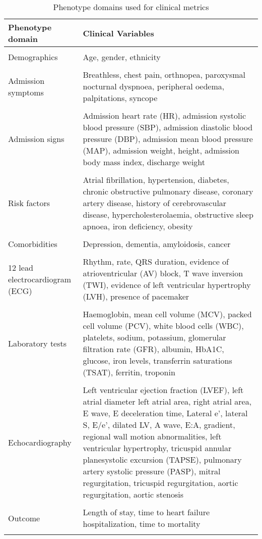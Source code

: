 \documentclass{article}
\begin{document}
\begin{longtable}{p{}  p{}}
    \caption{Phenotype domains used for clinical metrics}\\
    \toprule
    \textbf{Phenotype domain} & \textbf{Clinical Variables}\\
    \midrule
\endhead
&\\
Demographics & Age, gender, ethnicity\\
&\\
Admission symptoms & Breathless, chest pain, orthnopea, paroxysmal nocturnal dyspnoea, peripheral oedema, palpitations, syncope\\
&\\
Admission signs & Admission heart rate (HR), admission systolic blood pressure (SBP), admission diastolic blood pressure (DBP), admission mean blood pressure (MAP), admission weight, height, admission body mass index, discharge weight\\
&\\
Risk factors & Atrial fibrillation, hypertension, diabetes, chronic obstructive pulmonary disease, coronary artery disease, history of cerebrovascular disease, hypercholesterolaemia, obstructive sleep apnoea, iron deficiency, obesity\\
&\\
Comorbidities & Depression, dementia, amyloidosis, cancer\\
&\\
12 lead electrocardiogram (ECG) & Rhythm, rate, QRS duration, evidence of atrioventricular (AV) block, T wave inversion (TWI), evidence of left ventricular hypertrophy (LVH), presence of pacemaker\\
&\\
Laboratory tests & Haemoglobin, mean cell volume (MCV), packed cell volume (PCV), white blood cells (WBC), platelets, sodium, potassium, glomerular filtration rate (GFR), albumin, HbA1C, glucose, iron levels, transferrin saturations (TSAT), ferritin, troponin\\
&\\
Echocardiography & Left ventricular ejection fraction (LVEF), left atrial diameter left atrial area, right atrial area, E wave, E deceleration time, Lateral e’, lateral S, E/e’, dilated LV, A wave, E:A, gradient, regional wall motion abnormalities, left ventricular hypertrophy, tricuspid annular planesystolic excursion (TAPSE), pulmonary artery systolic pressure (PASP), mitral regurgitation, tricuspid regurgitation, aortic regurgitation, aortic stenosis\\
&\\
Outcome & Length of stay, time to heart failure hospitalization, time to mortality\\
&\\
\midrule
\end{longtable}
\end{document}
